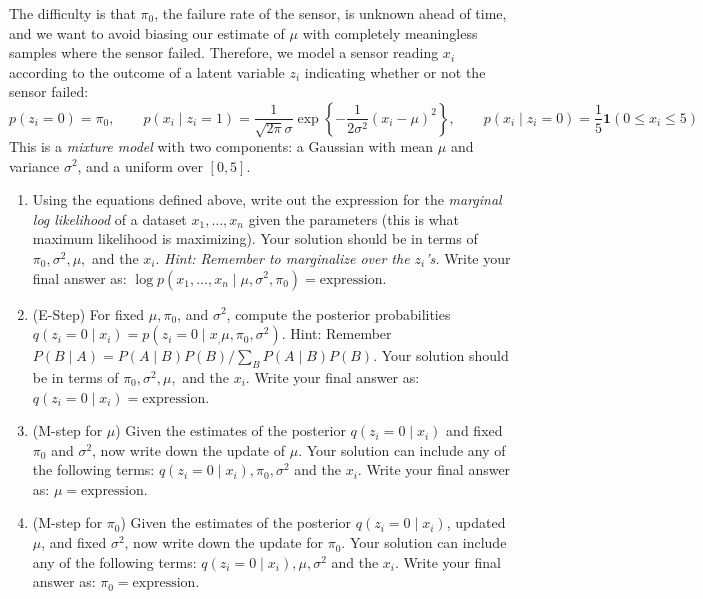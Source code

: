 The difficulty is that $\pi_0$, the failure rate of the sensor, is
unknown ahead of time, and we want to avoid biasing our estimate of
$\mu$ with completely meaningless samples where the sensor
failed. Therefore, we model a sensor reading $x_i$ according to the
outcome of a latent variable $z_i$ indicating whether or not the
sensor failed:
\begin{equation*}
  \label{eq:em-model}
  p(z_i = 0) = \pi_0,
  \qquad  p(x_i \mid z_i = 1) = \frac{1}{\sqrt{2\pi}\sigma} \exp \left\{ -\frac{1}{2\sigma^2}(x_i-\mu)^2 \right\},
  \qquad p(x_i \mid z_i = 0) = \frac{1}{5}\mathbf{1}(0\le x_{i}\le5)
\end{equation*}
This is a {\em mixture model} with two components: a Gaussian with
mean $\mu$ and variance $\sigma^2$, and a uniform over $[0,5]$.

\begin{enumerate}
\item {} Using the equations defined above, write out the
  expression for the {\em marginal log likelihood} of a dataset $x_1,
  \dots, x_n$ given the parameters (this is what maximum likelihood is
  maximizing). Your solution should be in terms of $\pi_0, \sigma^2,
  \mu,$ and the $x_i$. {\em Hint: Remember to marginalize over the
    $z_i$'s.}  Write your final answer as: $\log p(x_1,\dots,x_n \mid
  \mu,\sigma^2,\pi_0) = \textrm{expression}$.

\item {} (E-Step) For fixed $\mu,\pi_0$, and $\sigma^2$,
  compute the posterior probabilities $q(z_i = 0 \mid x_i) = p(z_i = 0
  \mid x_, \mu,\pi_0,\sigma^2)$.  Hint: Remember $P(B \mid A) = P(A
  \mid B)P(B)/\sum_B P(A \mid B)P(B)$.  Your solution should be in
  terms of $\pi_0, \sigma^2, \mu,$ and the $x_i$.  Write your final
  answer as: $q(z_i = 0 \mid x_i) = \textrm{expression}$.
  
\item {} (M-step for $\mu$) Given the estimates of the
  posterior $q(z_i = 0 \mid x_i)$ and fixed $\pi_0$ and $\sigma^2$,
  now write down the update of $\mu$.  Your solution can include any
  of the following terms: $q(z_i = 0 \mid x_i), \pi_0, \sigma^2$ and
  the $x_i$.  Write your final answer as: $\mu = \textrm{expression}$.
  
\item {} (M-step for $\pi_0$) Given the estimates of the
  posterior $q(z_i = 0 \mid x_i)$, updated $\mu$, and fixed
  $\sigma^2$, now write down the update for $\pi_0$.  Your solution
  can include any of the following terms: $q(z_i = 0 \mid x_i), \mu,
  \sigma^2$ and the $x_i$.  Write your final answer as: $\pi_0 =
  \textrm{expression}$.
  

\end{enumerate}
